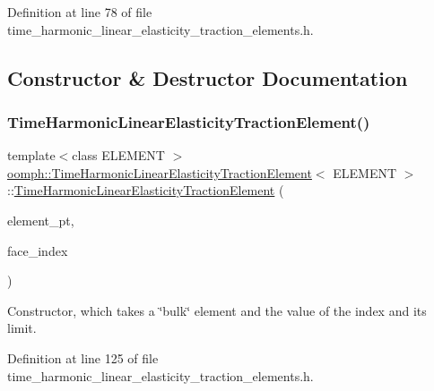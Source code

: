 Definition at line 78 of file time\+\_\+harmonic\+\_\+linear\+\_\+elasticity\+\_\+traction\+\_\+elements.\+h.



\subsection{Constructor \& Destructor Documentation}
\mbox{\label{classoomph_1_1TimeHarmonicLinearElasticityTractionElement_a3ee0f8496945991a8937207ab246602a}} 
\subsubsection{\texorpdfstring{Time\+Harmonic\+Linear\+Elasticity\+Traction\+Element()}{TimeHarmonicLinearElasticityTractionElement()}}
{\footnotesize\ttfamily template$<$class E\+L\+E\+M\+E\+NT $>$ \\
\hyperlink{classoomph_1_1TimeHarmonicLinearElasticityTractionElement}{oomph\+::\+Time\+Harmonic\+Linear\+Elasticity\+Traction\+Element}$<$ E\+L\+E\+M\+E\+NT $>$\+::\hyperlink{classoomph_1_1TimeHarmonicLinearElasticityTractionElement}{Time\+Harmonic\+Linear\+Elasticity\+Traction\+Element} (\begin{DoxyParamCaption}\item[{\hyperlink{classoomph_1_1FiniteElement}{Finite\+Element} $\ast$const \&}]{element\+\_\+pt,  }\item[{const int \&}]{face\+\_\+index }\end{DoxyParamCaption})\hspace{0.3cm}{\ttfamily [inline]}}



Constructor, which takes a \char`\"{}bulk\char`\"{} element and the value of the index and its limit. 



Definition at line 125 of file time\+\_\+harmonic\+\_\+linear\+\_\+elasticity\+\_\+traction\+\_\+elements.\+h.



